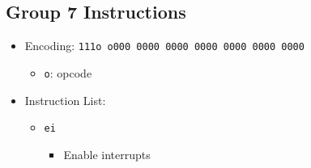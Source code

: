 \documentclass{article}
\begin{document}
	\subsection{Group 7 Instructions}
		\begin{itemize}
		\item Encoding:  \texttt{111o o000 0000 0000  0000 0000 0000 0000}
			\begin{itemize}
			\item \texttt{o}:  opcode
			\end{itemize}
		\item Instruction List:
			\begin{itemize}
			\item \texttt{ei}
				\begin{itemize}
				\item Enable interrupts
				\end{itemize}
			\end{itemize}
		\end{itemize}


\end{document}

